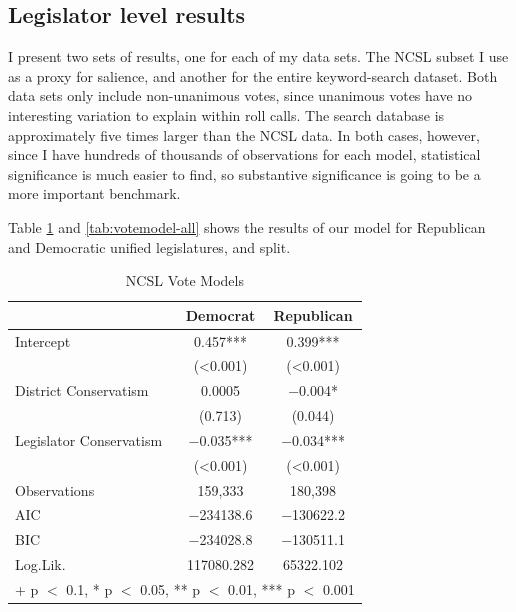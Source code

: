 \documentclass[
  oneside]{book}
\begin{document}
\hypertarget{legislator-level-results}{%
\subsection{Legislator level results}\label{legislator-level-results}}

I present two sets of results, one for each of my data sets. The NCSL subset I use as a proxy for salience, and another for the entire keyword-search dataset. Both data sets only include non-unanimous votes, since unanimous votes have no interesting variation to explain within roll calls. The search database is approximately five times larger than the NCSL data. In both cases, however, since I have hundreds of thousands of observations for each model, statistical significance is much easier to find, so substantive significance is going to be a more important benchmark.

Table \ref{tab:votemodel-ncsl} and \ref{tab:votemodel-all} shows the results of our model for Republican and Democratic unified legislatures, and split.

\begin{table}

\caption{\label{tab:votemodel-ncsl}NCSL Vote Models}
\centering
\begin{tabular}[t]{lcc}
\toprule
  & Democrat & Republican\\
\midrule
Intercept & \num{0.457}*** & \num{0.399}***\\
 & (\num{<0.001}) & \vphantom{1} (\num{<0.001})\\
District Conservatism & \num{0.0005} & \num{-0.004}*\\
 & (\num{0.713}) & (\num{0.044})\\
Legislator Conservatism & \num{-0.035}*** & \num{-0.034}***\\
 & (\num{<0.001}) & (\num{<0.001})\\
Observations & 159,333 & 180,398\\
\midrule
AIC & \num{-234138.6} & \num{-130622.2}\\
BIC & \num{-234028.8} & \num{-130511.1}\\
Log.Lik. & \num{117080.282} & \num{65322.102}\\
\bottomrule
\multicolumn{3}{l}{\rule{0pt}{1em}+ p $<$ 0.1, * p $<$ 0.05, ** p $<$ 0.01, *** p $<$ 0.001}\\
\end{tabular}
\end{table}
\end{document}
